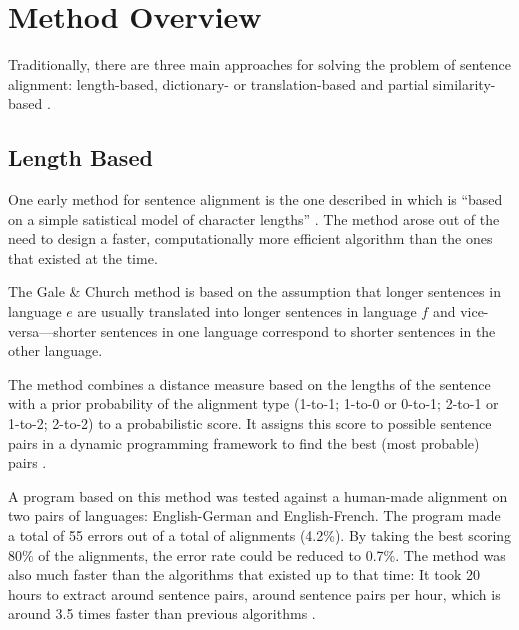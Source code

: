 \section{Method Overview}
\label{sec:overview_senalign}
Traditionally, there are three main approaches for solving the problem of sentence alignment:  length-based, dictionary- or translation-based and partial similarity-based \autocite{hunalign}. 

\subsection{Length Based}
One early method for sentence alignment is the one described in \cite{gale-church-1991-program} which is \enquote{based on a simple satistical model of character lengths} \autocite{gale-church-1991-program}. The method arose out of the need to design a faster, computationally more efficient algorithm than the ones that existed at the time\footnotemark.


The Gale \& Church method is based on the assumption that longer sentences in language \(e\) are usually translated into longer sentences in language \(f\) and vice-versa---shorter sentences in one language correspond to shorter sentences in the other language.

The method combines a distance measure based on the lengths of the sentence with a prior probability of the alignment type (1-to-1; 1-to-0 or 0-to-1; 2-to-1 or 1-to-2; 2-to-2) to a probabilistic score. 
It assigns this score to possible sentence pairs in a dynamic programming framework to find the best (most probable) pairs \autocite[57]{koehn2009}. 

A program based on this method was tested against a human-made alignment on two pairs of languages: English-German and English-French. 
The program made a total of 55 errors out of a total of  alignments (4.2\%). 
By taking the best scoring 80\% of the alignments, the error rate could be reduced to 0.7\%.
The method was also much faster than the algorithms that existed up to that time: 
It took 20 hours to extract around  sentence pairs, around  sentence pairs per hour, which is around 3.5 times faster than previous algorithms \autocite{gale-church-1991-program}.

